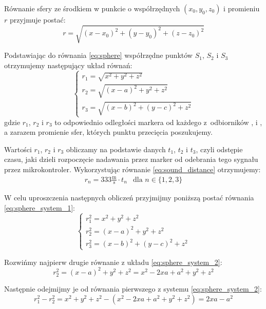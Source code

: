 Równanie sfery ze środkiem w punkcie o współrzędnych $(x_0, y_0, z_0)$ i promieniu $r$ przyjmuje postać:
\begin{equation}
 r = \sqrt{(x - x_0)^2 + (y - y_0)^2 + (z - z_0)^2}
 \label{eq:sphere}
\end{equation}

Podstawiając do równania \ref{eq:sphere} współrzędne punktów $S_1$, $S_2$ i $S_3$ otrzymujemy następujący układ równań:
\begin{equation}
 \begin{cases}
  r_1 = \sqrt{x^2 + y^2 + z^2} \\
  r_2 = \sqrt{(x - a)^2 + y^2 + z^2} \\
  r_3 = \sqrt{(x - b)^2 + (y - c)^2 + z^2}
 \end{cases}
 \label{eq:sphere_system_1}
\end{equation}
gdzie $r_1$, $r_2$ i $r_3$ to odpowiednio odległości markera od każdego z~odbiorników ,  i , a zarazem promienie sfer, których punktu przecięcia poszukujemy.

Wartości $r_1$, $r_2$ i $r_3$ obliczamy na podstawie danych $t_1$, $t_2$ i $t_3$, czyli odstępie czasu, jaki dzieli rozpoczęcie nadawania przez marker od odebrania tego sygnału przez mikrokontroler. Wykorzystując równanie \ref{eq:sound_distance} otrzymujemy:
\begin{eqnarray}
  r_n = 333\frac{\textrm{m}}{\textrm{s}} \cdot t_n & \textrm{dla } n \in \{1, 2, 3\}
\end{eqnarray}


W celu uproszczenia następnych obliczeń przyjmijmy poniższą postać równania \ref{eq:sphere_system_1}:
\begin{equation}
 \begin{cases}
  r_1^2 = x^2 + y^2 + z^2 \\
  r_2^2 = (x - a)^2 + y^2 + z^2 \\
  r_3^2 = (x - b)^2 + (y - c)^2 + z^2
 \end{cases}
 \label{eq:sphere_system_2}
\end{equation}

Rozwińmy najpierw drugie równanie z układu \ref{eq:sphere_system_2}:
\begin{equation}
 r_2^2 = (x - a)^2 + y^2 + z^2 = x^2 - 2xa + a^2 + y^2 + z^2
\end{equation}

Następnie odejmijmy je od równania pierwszego z systemu \ref{eq:sphere_system_2}:
\begin{equation}
 r_1^2 - r_2^2 = x^2 + y^2 + z^2 - (x^2 - 2xa + a^2 + y^2 + z^2) = 2xa - a^2
 \label{eq:determine_x_1}
\end{equation}


